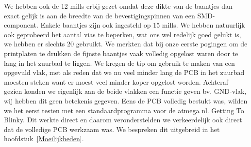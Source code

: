 We hebben ook de 12 mills erbij gezet omdat deze dikte van de baantjes dan exact gelijk is aan de breedte van de bevestigingspinnen van een SMD-component. Enkele baantjes zijn ook ingesteld op 15 mills. We hebben natuurlijk ook geprobeerd het aantal vias te beperken, wat ons wel redelijk goed gelukt is, we hebben er slechts 20 gebruikt. We merkten dat bij onze eerste pogingen om de printplaten te drukken de fijnste baantjes vaak volledig opgelost waren door te lang in het zuurbad te liggen. We kregen de tip om gebruik te maken van een opgevuld vlak, met als reden dat we nu veel minder lang de PCB in het zuurbad moesten steken want er moest veel minder koper opgelost worden. Achteraf gezien konden we eigenlijk aan de beide vlakken een functie geven bv. GND-vlak, wij hebben dit geen betekenis gegeven. Eens de PCB volledig bestukt was, wilden we het eerst testen met een standaardprogramma voor de atmega nl. Getting To Blinky. Dit werkte direct en daarom veronderstelden we verkeerdelijk ook direct dat de volledige PCB werkzaam was. We bespreken dit uitgebreid in het hoofdstuk~\ref{Moeilijkheden}. 


